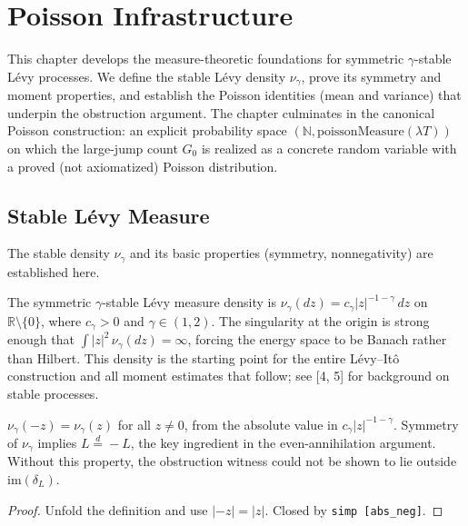 \chapter{Poisson Infrastructure}

This chapter develops the measure-theoretic foundations for symmetric $\gamma$-stable
L\'evy processes. We define the stable L\'evy density $\nu_\gamma$, prove its symmetry
and moment properties, and establish the Poisson identities (mean and variance) that
underpin the obstruction argument. The chapter culminates in the canonical Poisson
construction: an explicit probability space $(\mathbb{N}, \mathrm{poissonMeasure}(\lambda T))$
on which the large-jump count $G_0$ is realized as a concrete random variable with
a proved (not axiomatized) Poisson distribution.

\section{Stable Lévy Measure}

The stable density $\nu_\gamma$ and its basic properties (symmetry, nonnegativity) are established here.

\begin{defn}\label{def:stable_density}
\leanok
The symmetric $\gamma$-stable Lévy measure density is
$\nu_\gamma(dz) = c_\gamma |z|^{-1-\gamma}\,dz$ on $\mathbb{R} \setminus \{0\}$,
where $c_\gamma > 0$ and $\gamma \in (1,2)$.
The singularity at the origin is strong enough that
$\int |z|^2\,\nu_\gamma(dz) = \infty$, forcing the energy space to be Banach rather than Hilbert.
This density is the starting point for the entire Lévy--Itô construction and all moment estimates that follow; see [4, 5] for background on stable processes.
\end{defn}

\begin{theorem}\label{thm:density_sym}
\leanok
{}
$\nu_\gamma(-z) = \nu_\gamma(z)$ for all $z \neq 0$, from the absolute value in $c_\gamma |z|^{-1-\gamma}$.
Symmetry of $\nu_\gamma$ implies $L \stackrel{d}{=} -L$, the key ingredient in the even-annihilation argument.
Without this property, the obstruction witness could not be shown to lie outside $\mathrm{im}(\delta_L)$.
\end{theorem}
\begin{proof}\leanok Unfold the definition and use $|-z| = |z|$. Closed by \texttt{simp [abs\_neg]}.\end{proof}


